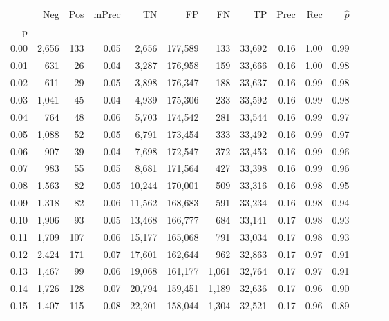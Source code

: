 \begin{tabular}{rrrrrrrrrrrrrr}
\toprule
{} &    Neg &  Pos & mPrec &       TN &       FP &      FN &      TP &  Prec &   Rec & $\hat{p}$ \\
p    &        &      &       &          &          &         &         &       &       &           \\
\midrule
0.00 &  2,656 &  133 &  0.05 &    2,656 &  177,589 &     133 &  33,692 &  0.16 &  1.00 &      0.99 \\
0.01 &    631 &   26 &  0.04 &    3,287 &  176,958 &     159 &  33,666 &  0.16 &  1.00 &      0.98 \\
0.02 &    611 &   29 &  0.05 &    3,898 &  176,347 &     188 &  33,637 &  0.16 &  0.99 &      0.98 \\
0.03 &  1,041 &   45 &  0.04 &    4,939 &  175,306 &     233 &  33,592 &  0.16 &  0.99 &      0.98 \\
0.04 &    764 &   48 &  0.06 &    5,703 &  174,542 &     281 &  33,544 &  0.16 &  0.99 &      0.97 \\
0.05 &  1,088 &   52 &  0.05 &    6,791 &  173,454 &     333 &  33,492 &  0.16 &  0.99 &      0.97 \\
0.06 &    907 &   39 &  0.04 &    7,698 &  172,547 &     372 &  33,453 &  0.16 &  0.99 &      0.96 \\
0.07 &    983 &   55 &  0.05 &    8,681 &  171,564 &     427 &  33,398 &  0.16 &  0.99 &      0.96 \\
0.08 &  1,563 &   82 &  0.05 &   10,244 &  170,001 &     509 &  33,316 &  0.16 &  0.98 &      0.95 \\
0.09 &  1,318 &   82 &  0.06 &   11,562 &  168,683 &     591 &  33,234 &  0.16 &  0.98 &      0.94 \\
0.10 &  1,906 &   93 &  0.05 &   13,468 &  166,777 &     684 &  33,141 &  0.17 &  0.98 &      0.93 \\
0.11 &  1,709 &  107 &  0.06 &   15,177 &  165,068 &     791 &  33,034 &  0.17 &  0.98 &      0.93 \\
0.12 &  2,424 &  171 &  0.07 &   17,601 &  162,644 &     962 &  32,863 &  0.17 &  0.97 &      0.91 \\
0.13 &  1,467 &   99 &  0.06 &   19,068 &  161,177 &   1,061 &  32,764 &  0.17 &  0.97 &      0.91 \\
0.14 &  1,726 &  128 &  0.07 &   20,794 &  159,451 &   1,189 &  32,636 &  0.17 &  0.96 &      0.90 \\
0.15 &  1,407 &  115 &  0.08 &   22,201 &  158,044 &   1,304 &  32,521 &  0.17 &  0.96 &      0.89 \\

\end{tabular}

